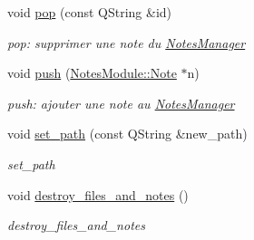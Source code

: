\begin{DoxyCompactItemize}
void \hyperlink{classmanagers_1_1_notes_manager_ad267f6048e6a123a6ee36c729c6c2a82}{pop} (const Q\-String \&id)
\begin{DoxyCompactList}\small\item\em pop\-: supprimer une note du \hyperlink{classmanagers_1_1_notes_manager}{Notes\-Manager} \end{DoxyCompactList}\item 
void \hyperlink{classmanagers_1_1_notes_manager_a204484e0e12adb34d7bce4cdee6e183c}{push} (\hyperlink{class_notes_module_1_1_note}{Notes\-Module\-::\-Note} $\ast$n)
\begin{DoxyCompactList}\small\item\em push\-: ajouter une note au \hyperlink{classmanagers_1_1_notes_manager}{Notes\-Manager} \end{DoxyCompactList}\item 
void \hyperlink{classmanagers_1_1_notes_manager_ac2b07c986b38abd85b68dba39e5c8943}{set\-\_\-path} (const Q\-String \&new\-\_\-path)
\begin{DoxyCompactList}\small\item\em set\-\_\-path \end{DoxyCompactList}\item 
void \hyperlink{classmanagers_1_1_notes_manager_a9aa1f9c67e3e06325aa9aeaaf6cd5361}{destroy\-\_\-files\-\_\-and\-\_\-notes} ()
\begin{DoxyCompactList}\small\item\em destroy\-\_\-files\-\_\-and\-\_\-notes \end{DoxyCompactList}\end{DoxyCompactItemize}
